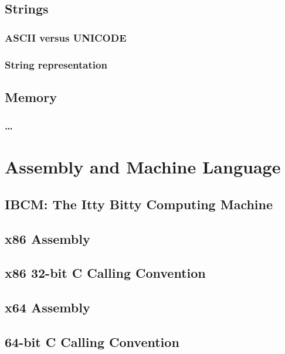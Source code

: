 \documentclass[11pt,twoside]{book}
\begin{document}
\chapter{Strings}

\section{ASCII versus UNICODE}

\section{String representation}


\chapter{Memory}

\section{\ldots}

\part{Assembly and Machine Language}

\chapter{IBCM: The Itty Bitty Computing Machine}



\chapter{x86 Assembly}



\chapter{x86 32-bit C Calling Convention}




\chapter{x64 Assembly}

\chapter{64-bit C Calling Convention}
\end{document}
